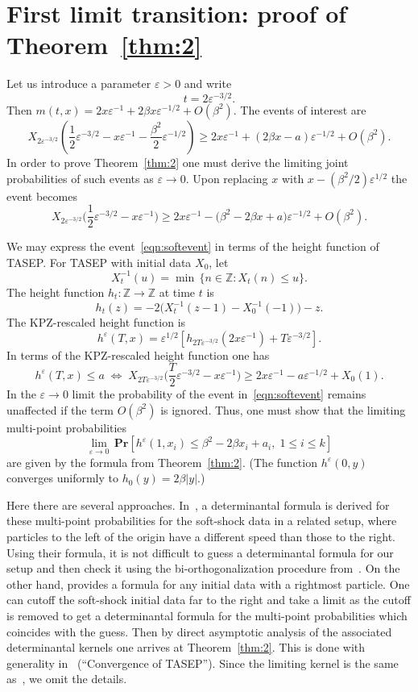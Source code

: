 \documentclass[10pt]{amsart}
\theoremstyle{definition}\newtheorem{defi}[theo]{Definition}\newtheorem{rema}[theo]{Remark}\newtheorem{exam}[theo]{Example}\newtheorem{exem}[theo]{Example}\newtheorem{nota}[theo]{Notation}
\newcommand{\pr}[1]{\mathbf{Pr}\left[#1\right]}
\newcommand{\eps}{\varepsilon}
\newcommand{\Z}{\mathbb{Z}}
\begin{document}
\section{First limit transition: proof of Theorem~\ref{thm:2}} \label{sec:KPZlimit}

Let us introduce a parameter $\eps > 0$ and write
\[
t = 2 \eps^{-3/2}.
\]
Then $m(t,x) = 2x \eps^{-1} + 2\beta x \eps^{-1/2} + O(\beta^2)$. The events of interest are
\[
X_{2 \eps^{-3/2}}\left(\frac{1}{2}\eps^{-3/2} -x\eps^{-1} - \frac{\beta^2}{2} \eps^{-1/2}\right) \geq
2x \eps^{-1} + (2\beta x -a)\eps^{-1/2} + O(\beta^2).
\]
In order to prove Theorem~\ref{thm:2} one must derive the limiting joint probabilities of such events as $\eps \to 0$. Upon replacing $x$ with $x - (\beta^2/2)\eps^{1/2}$ the event becomes
\begin{equation}\label{eqn:softevent}
X_{2 \eps^{-3/2}}\Big(\frac{1}{2}\eps^{-3/2} -x\eps^{-1}\Big)
\geq 2x \eps^{-1} - \big(\beta^2 - 2\beta x + a \big)\eps^{-1/2} + O(\beta^2).
\end{equation}

We may express the event~\eqref{eqn:softevent} in terms of the height function of TASEP. For TASEP with initial data $X_0$, let
\[
X_t^{-1}(u) = \min\, \{n \in \Z: X_t(n) \leq u\}.
\]
The height function $h_t: \Z \to \Z$ at time $t$ is
\[
h_t(z) = -2 \big (X_t^{-1}(z-1) - X_0^{-1}(-1) \big) - z.
\]
The KPZ-rescaled height function is
\begin{equation}\label{eqn:KPZh}
h^{\eps}(T,x) = \eps^{1/2} \left [h_{2T\eps^{-3/2}}(2x\eps^{-1}) + T \eps^{-3/2} \right].
\end{equation}
In terms of the KPZ-rescaled height function one has
\[
h^{\eps}(T,x) \leq a \;\Longleftrightarrow\;
X_{2T\eps^{-3/2}}\bigg(\frac{T}{2}\eps^{-3/2} - x\eps^{-1}\bigg) \geq 2x\eps^{-1} - a \eps^{-1/2} + X_0(1).
\]
In the $\eps \to 0$ limit the probability of the event in~\eqref{eqn:softevent} remains unaffected if the term $O(\beta^2)$ is ignored. Thus, one must show that the limiting multi-point probabilities
\[
\lim_{\eps \to 0}\, \pr{ h^{\eps}(1,x_i) \leq \beta^2 - 2\beta x_i +a_i, \; 1\leq i \leq k}
\]
are given by the formula from Theorem~\ref{thm:2}. (The function $h^{\eps}(0,y)$ converges uniformly to $h_0(y)= 2\beta |y|$.)

Here there are several approaches. In~\cite{FN2}, a determinantal formula is derived for these multi-point probabilities for the soft-shock data in a related setup, where particles to the left of the origin have a different speed than those to the right. Using their formula, it is not difficult to guess a determinantal formula for our setup and then check it using the bi-orthogonalization procedure from~\cite{BFPS, Sas}. On the other hand, \cite[Theorem~2.6]{MQR} provides a formula for any initial data with a rightmost particle. One can cutoff the soft-shock initial data far to the right and take a limit as the cutoff is removed to get a determinantal formula for the multi-point probabilities which coincides with the guess. Then by direct asymptotic analysis of the associated determinantal kernels one arrives at Theorem~\ref{thm:2}. This is done with generality in~\cite[Theorem~3.13]{MQR} (``Convergence of TASEP''). Since the limiting kernel is the same as~\cite{FN2}, we omit the details.
\end{document}
